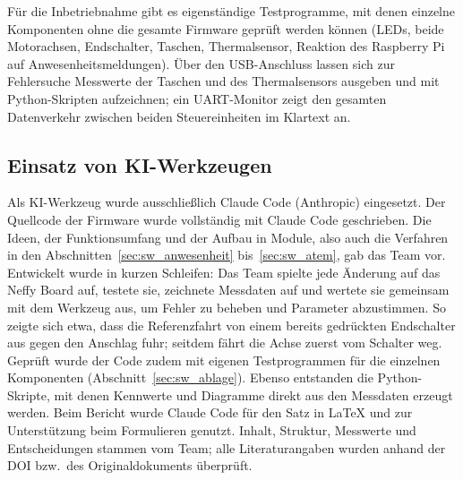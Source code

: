Für die Inbetriebnahme gibt es eigenständige Testprogramme, mit denen einzelne Komponenten
ohne die gesamte Firmware geprüft werden können (\acp{LED}, beide Motorachsen, Endschalter,
Taschen, Thermalsensor, Reaktion des Raspberry Pi auf Anwesenheitsmeldungen). Über den
USB-Anschluss lassen sich zur Fehlersuche Messwerte der Taschen und des Thermalsensors
ausgeben und mit Python-Skripten aufzeichnen; ein \ac{UART}-Monitor zeigt den gesamten
Datenverkehr zwischen beiden Steuereinheiten im Klartext an.

\subsection{Einsatz von KI-Werkzeugen}
\label{sec:sw_ki}

Als \ac{KI}-Werkzeug wurde ausschließlich Claude Code (Anthropic) eingesetzt. Der Quellcode der
Firmware wurde vollständig mit Claude Code geschrieben. Die Ideen, der Funktionsumfang und der
Aufbau in Module, also auch die Verfahren in den Abschnitten~\ref{sec:sw_anwesenheit}
bis~\ref{sec:sw_atem}, gab das Team vor. Entwickelt wurde in kurzen Schleifen: Das Team
spielte jede Änderung auf das Neffy Board auf, testete sie, zeichnete Messdaten auf und wertete sie
gemeinsam mit dem Werkzeug aus, um Fehler zu beheben und Parameter abzustimmen. So zeigte sich
etwa, dass die Referenzfahrt von einem bereits gedrückten Endschalter aus gegen den Anschlag fuhr;
seitdem fährt die Achse zuerst vom Schalter weg. Geprüft wurde der Code zudem mit eigenen
Testprogrammen für die einzelnen Komponenten (Abschnitt~\ref{sec:sw_ablage}). Ebenso entstanden die Python-Skripte, mit denen
Kennwerte und Diagramme direkt aus den Messdaten erzeugt werden.
Beim Bericht wurde Claude Code für den Satz in \LaTeX{} und zur Unterstützung beim Formulieren
genutzt. Inhalt, Struktur, Messwerte und Entscheidungen stammen vom Team; alle
Literaturangaben wurden anhand der DOI bzw.\ des Originaldokuments überprüft.
